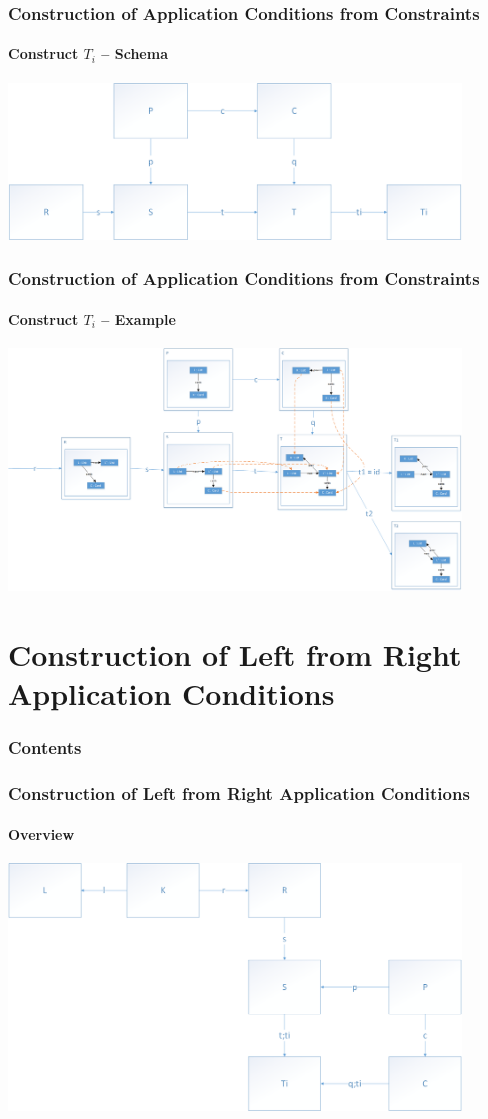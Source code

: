 \documentclass[32pt,t]{beamer}
\begin{document}
	\begin{frame}
		\frametitle{Construction of Application Conditions from Constraints}
		\framesubtitle{Construct $T_i$ -- Schema}
		\centering
		\includegraphics[width=12cm]{Images/30_Construct_Tis_Schema}
	\end{frame}

	\begin{frame}
		\frametitle{Construction of Application Conditions from Constraints}
		\framesubtitle{Construct $T_i$ -- Example}
		\centering
		\includegraphics[width=12cm]{Images/31_Construct_Tis_Example}
	\end{frame}

\section{Construction of Left from Right Application Conditions}
	\begin{frame}
		\frametitle{Contents}
		\tableofcontents[currentsection]
	\end{frame}

	\begin{frame}
		\frametitle{Construction of Left from Right Application Conditions}
		\framesubtitle{Overview}
		\centering
		\includegraphics[width=12cm]{Images/40_Overview_RightAC_Schema}
	\end{frame}
\end{document}
